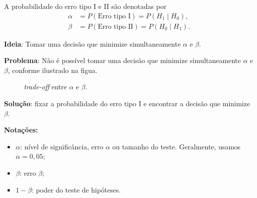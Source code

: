 \documentclass[8pt]{beamer}
\begin{document}
\begin{frame}{}

\small

 A probabilidade do erro tipo I e II são denotadas por
 \begin{align*}
  \alpha &= P(\mbox{Erro tipo I}) = P(H_1 \mid H_0),\\
  \beta &= P(\mbox{Erro tipo II}) = P(H_0 \mid H_1).
 \end{align*}
\vfill
 
 {\color{blue} \textbf{Ideia}:  Tomar uma decisão que minimize simultaneamente $\alpha$ e $\beta$.} 
  \vfill
  
  {\color{red} \textbf{Problema}:  Não é possível tomar uma decisão que minimize simultaneamente $\alpha$ e $\beta$, conforme ilustrado na figua.}
  \begin{figure}[!htbp]
    \centering
    \caption{\textit{trade-off} entre $\alpha$ e $\beta$.}
    \label{fig:alpha_beta}
   \end{figure}

  \vfill
  
  {\color{red} \textbf{Solução}:  fixar a probabilidade do erro tipo I e encontrar a decisão que minimize $\beta$.}
  \vfill
 

\textcolor{important}{\bf Notações:}
\begin{itemize}
	\item \textcolor{important}{$\alpha$: nível de significância, erro $\alpha$ ou tamanho do teste. Geralmente, usamos $\alpha=0,05$;}
	\item \textcolor{important}{$\beta$: erro $\beta$;}
	\item \textcolor{important}{$1-\beta$: poder do teste de hipóteses.}
\end{itemize}

 
\end{frame}
\end{document}
